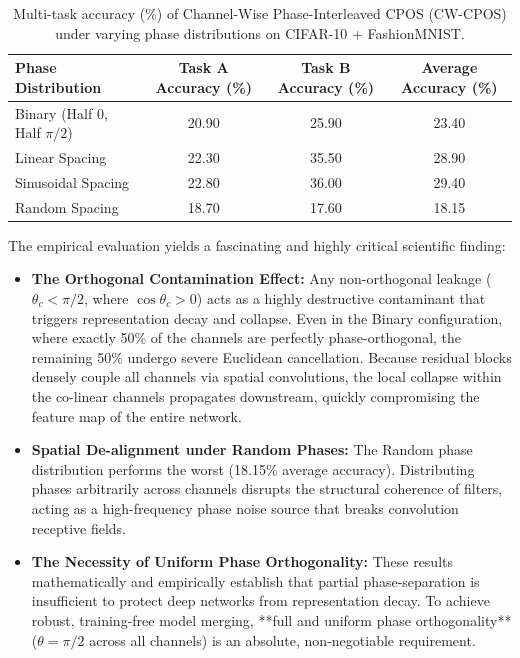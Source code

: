 \documentclass{article}
\theoremstyle{plain}
\theoremstyle{definition}
\theoremstyle{remark}
\begin{document}
\begin{table}[h]
\caption{Multi-task accuracy (\%) of Channel-Wise Phase-Interleaved CPOS (CW-CPOS) under varying phase distributions on CIFAR-10 + FashionMNIST.}
\label{tab:channel_wise}
\begin{center}
\begin{small}
\begin{sc}
\begin{tabular}{lccc}
\toprule
Phase Distribution & Task A Accuracy (\%) & Task B Accuracy (\%) & Average Accuracy (\%) \\
\midrule
Binary (Half 0, Half $\pi/2$) & 20.90 & 25.90 & 23.40 \\
Linear Spacing & 22.30 & 35.50 & 28.90 \\
Sinusoidal Spacing & 22.80 & 36.00 & 29.40 \\
Random Spacing & 18.70 & 17.60 & 18.15 \\
\bottomrule
\end{tabular}
\end{sc}
\end{small}
\end{center}
\end{table}

The empirical evaluation yields a fascinating and highly critical scientific finding:
\begin{itemize}
\item \textbf{The Orthogonal Contamination Effect:} Any non-orthogonal leakage ($\theta_c < \pi/2$, where $\cos \theta_c > 0$) acts as a highly destructive contaminant that triggers representation decay and collapse. Even in the Binary configuration, where exactly 50\% of the channels are perfectly phase-orthogonal, the remaining 50\% undergo severe Euclidean cancellation. Because residual blocks densely couple all channels via spatial convolutions, the local collapse within the co-linear channels propagates downstream, quickly compromising the feature map of the entire network.
\item \textbf{Spatial De-alignment under Random Phases:} The Random phase distribution performs the worst (18.15\% average accuracy). Distributing phases arbitrarily across channels disrupts the structural coherence of filters, acting as a high-frequency phase noise source that breaks convolution receptive fields.
\item \textbf{The Necessity of Uniform Phase Orthogonality:} These results mathematically and empirically establish that partial phase-separation is insufficient to protect deep networks from representation decay. To achieve robust, training-free model merging, **full and uniform phase orthogonality** ($\theta = \pi/2$ across all channels) is an absolute, non-negotiable requirement.
\end{itemize}
\end{document}
